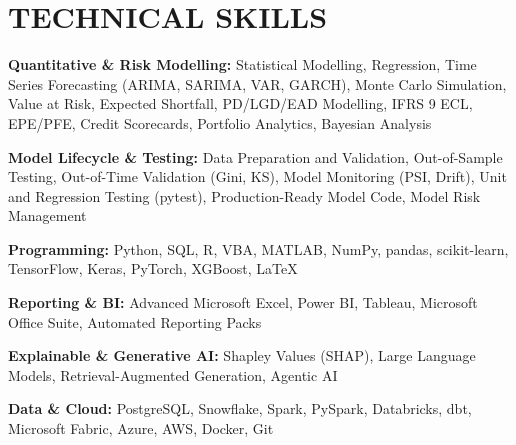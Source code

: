 \documentclass[letterpaper,11pt]{article}
\begin{document}
\section{TECHNICAL SKILLS}
\vspace{4pt}
 \begin{itemize}[leftmargin=0in, label={}]
    \small{\item{
     \textbf{\small{Quantitative \& Risk Modelling:}}{ \small{Statistical Modelling, Regression, Time Series Forecasting (ARIMA, SARIMA, VAR, GARCH), Monte Carlo Simulation, Value at Risk, Expected Shortfall, PD/LGD/EAD Modelling, IFRS 9 ECL, EPE/PFE, Credit Scorecards, Portfolio Analytics, Bayesian Analysis}} \\
      \vspace{1.2pt}

     \textbf{\small{Model Lifecycle \& Testing:}}{ \small{Data Preparation and Validation, Out-of-Sample Testing, Out-of-Time Validation (Gini, KS), Model Monitoring (PSI, Drift), Unit and Regression Testing (pytest), Production-Ready Model Code, Model Risk Management}} \\
      \vspace{1.2pt}

     \textbf{\small{Programming:}}{ \small{Python, SQL, R, VBA, MATLAB, NumPy, pandas, scikit-learn, TensorFlow, Keras, PyTorch, XGBoost, LaTeX}} \\
      \vspace{1.2pt}

     \textbf{\small{Reporting \& BI:}}{ \small{Advanced Microsoft Excel, Power BI, Tableau, Microsoft Office Suite, Automated Reporting Packs}} \\
      \vspace{1.2pt}

     \textbf{\small{Explainable \& Generative AI:}}{ \small{Shapley Values (SHAP), Large Language Models, Retrieval-Augmented Generation, Agentic AI}} \\
      \vspace{1.2pt}

     \textbf{\small{Data \& Cloud:}}{ \small{PostgreSQL, Snowflake, Spark, PySpark, Databricks, dbt, Microsoft Fabric, Azure, AWS, Docker, Git}}

     }}
 \end{itemize}
 \vspace{-10pt}

\end{document}
